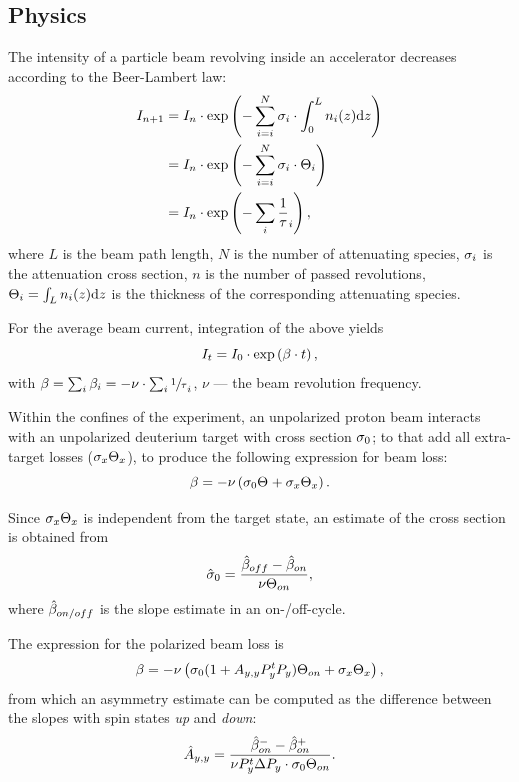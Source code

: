 \documentclass[reprint]{revtex4-1}
\newcommand{\td}{\mathrm{d}}
\begin{document}
\subsection{Physics}
The intensity of a particle beam revolving inside an accelerator decreases according to the Beer-Lambert law:
\begin{align*}
	I_{n+1} &= I_n \cdot \exp\bkt{-\sum_{i=i}^N \CS[i]\cdot\int_0^L n_i(z)\td z} \\
			&= I_n \cdot \exp\bkt{-\sum_{i=i}^N \CS[i]\cdot \Thick[i]} \\
			&= I_n \cdot \exp\bkt{-\sum_i\frac1\tau_i},
\end{align*}
where $L$ is the beam path length, $N$ is the number of attenuating species, $\CS[i]$ is the attenuation cross section, $n$ is the number of passed revolutions, $\Thick[i] = \int_L n_i(z)\td z$ is the thickness of the corresponding attenuating species.

For the average beam current, integration of the above yields
\begin{equation}\label{eq:CurrentDecay}
	I_t = I_0 \cdot \exp\bkt{\slp\cdot t},
\end{equation}
with $\slp = \sum_i \slp[i] = - \nu\cdot\sum_i \sfrac1\tau_i$, $\nu$ --- the beam revolution frequency. 

Within the confines of the experiment, an unpolarized proton beam interacts with an unpolarized deuterium target with cross section $\CS[0]$; to that add all extra-target losses ($\CS[x]\Thick[x]$), to produce the following expression for beam loss:
\begin{equation}\label{eq:SlopeModel}
	\slp = -\nu\bkt{\CS[0]\Thick + \CS[x]\Thick[x]}.
\end{equation}

Since $\CS[x]\Thick[x]$ is independent from the target state, an estimate of the cross section is obtained from  
\begin{equation}
	\CS*[0] = \frac{\slp*[off] - \slp*[on]}{\nu\Thick[on]},
\end{equation}
where $\slp*[on/off]$ is the slope estimate in an on-/off-cycle.

The expression for the polarized beam loss is 
\[
	\slp = -\nu\bkt{\CS[0](1 + \Ayy P_y^t P_y)\Thick[on] + \CS[x]\Thick[x]},
\]
from which an asymmetry estimate can be computed as the difference between the slopes with spin states \emph{up} and \emph{down}:
\begin{equation}\label{eq:AyyEst}
	\Ayy* = \frac{\slp*[on]^- - \slp*[on]^+}{\nu P_y^t\Delta P_y\cdot \CS[0]\Thick[on]}.
\end{equation}
\end{document}

